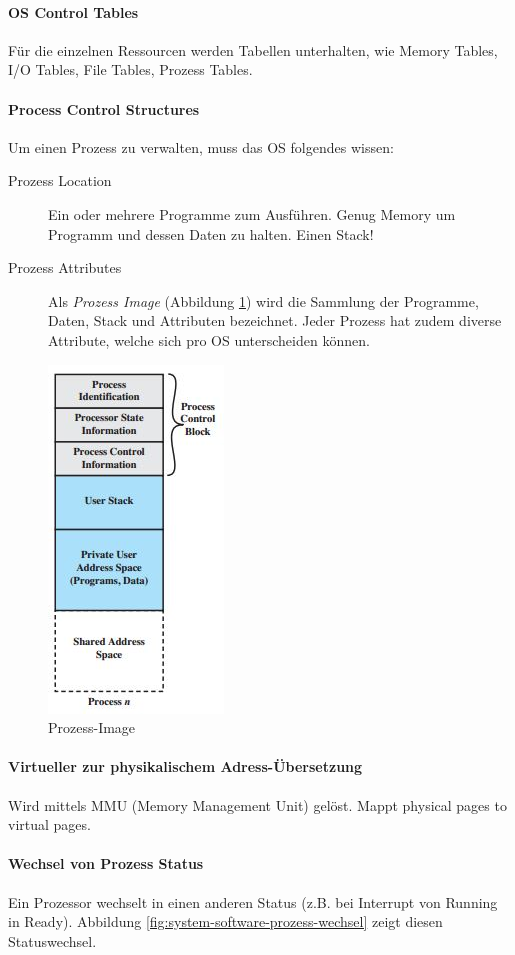 \paragraph{OS Control Tables} Für die einzelnen Ressourcen werden Tabellen unterhalten, wie Memory Tables, I/O Tables, File Tables, Prozess Tables.

\paragraph{Process Control Structures}
Um einen Prozess zu verwalten, muss das OS folgendes wissen:
\begin{description}
	\item[Prozess Location] Ein oder mehrere Programme zum Ausführen. Genug Memory um Programm und dessen Daten zu halten. Einen Stack!
	\item[Prozess Attributes] Als \emph{Prozess Image} (Abbildung \ref{fig:system-software-prozess-image}) wird die Sammlung der Programme, Daten, Stack und Attributen bezeichnet. Jeder Prozess hat zudem diverse Attribute, welche sich pro OS unterscheiden können.
\end{description}

\begin{figure}[h!]
	\centering
	\includegraphics[width=0.2\linewidth]{fig/system-software-prozess-image}
	\caption{Prozess-Image}
	\label{fig:system-software-prozess-image}
\end{figure}

\paragraph{Virtueller zur physikalischem Adress-Übersetzung}
Wird mittels MMU (Memory Management Unit) gelöst. Mappt physical pages to virtual pages.

\paragraph{Wechsel von Prozess Status}
Ein Prozessor wechselt in einen anderen Status (z.B. bei Interrupt von Running in Ready). Abbildung \ref{fig:system-software-prozess-wechsel} zeigt diesen Statuswechsel.


